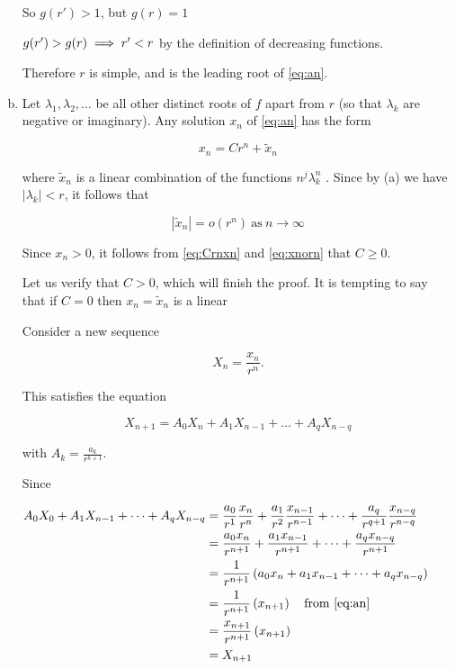 \begin{theorem}
\begin{pf}
\begin{enumerate}[(a)]
So $g(r')>1$, but $g(r)=1$

\imp $g(r')>g(r)\implies r'<r$ by the definition of decreasing functions.

Therefore $r$  is simple, and is the leading root of  \ref{eq:an}.

\item Let $\lambda_1, \lambda_2, \dots$ be all other distinct roots of $f$ apart from $r$ (so that $\lambda_k$ are negative or imaginary). Any solution $x_n$ of \ref{eq:an} has the form

\begin{equation} \label{eq:Crnxn}
x_n = Cr^n +\tilde{x}_n    
\end{equation}

where $\tilde{x}_n$ is a linear combination of the functions $n^j\lambda^n_k$ . Since by (a) we have $|\lambda_k| < r$, it follows that

\begin{equation} \label{eq:xnorn}
|\tilde{x}_n| = o(r^n) \ \text{as} \ n\to\infty    
\end{equation}

Since $x_n > 0$, it follows from \ref{eq:Crnxn} and \ref{eq:xnorn} that $C \geq 0$. 

Let us verify that $C > 0$, which will finish the proof. It is tempting to say that if $C = 0$ then $x_n = \tilde{x}_n$ is a linear 

Consider a new sequence 

$$ X_n = \frac{x_n}{r^n}.$$

This satisfies the equation

\begin{equation} \label{eq:AkXk}
X_{n+1}=A_0X_n+A_1X_{n-1}+\dots+A_qX_{n-q}
\end{equation}

with $A_k = \frac{a_k}{r^{k+1}}$. 

Since

$\begin{aligned}
A_0X_0+A_1X_{n-1}+\dots+A_qX_{n-q} 
&= \frac{a_0}{r^1}\frac{x_n}{r^n} + \frac{a_1}{r^2}\frac{x_{n-1}}{r^{n-1}} +  \dots + \frac{a_q}{r^{q+1}}\frac{x_{n-q}}{r^{n-q}}\\
&= \frac{a_0x_n}{r^{n+1}} + \frac{a_1x_{n-1}}{r^{n+1}} + \dots + \frac{a_qx_{n-q}}{r^{n+1}}\\
&= \frac1{r^{n+1}}\left(a_0x_n+a_1x_{n-1}+\dots + a_qx_{n-q}\right)\\
&= \frac1{r^{n+1}}\left(x_{n+1}\right) \quad \text{from } \ref{eq:an} \\
&= \frac{x_{n+1}}{r^{n+1}}\left(x_{n+1}\right) \\
&= X_{n+1}
\end{aligned}$


\end{enumerate}
\end{pf}
\end{theorem}
